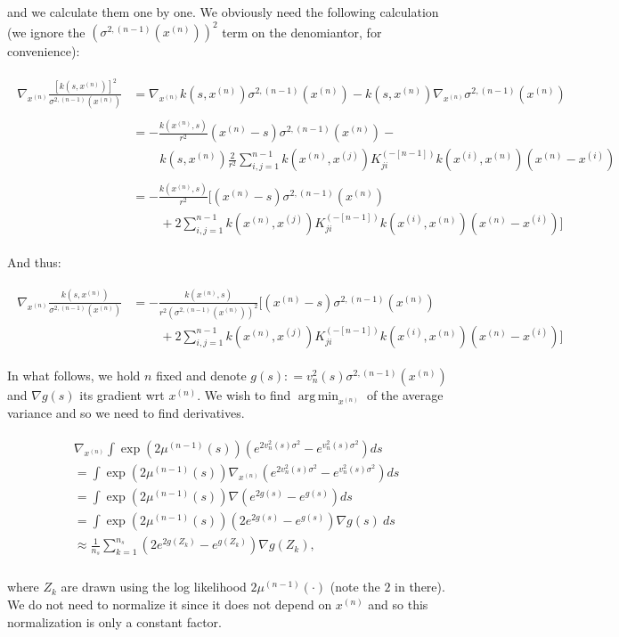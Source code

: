 \documentclass[paper=a4, fontsize=11pt]{scrartcl} %
\DeclareMathOperator*{\argmin}{arg\,min}
\numberwithin{equation}{section} %
\numberwithin{figure}{section} %
\numberwithin{table}{section} %
\newcommand{\bars}{ \ \ \ \ \ \ \ \ \ \ }
\newcommand{\gxn}{\nabla_{x^{(n)}}} %
\newcommand{\xn}{x^{(n)}}
\newcommand{\xii}{x^{(i)}}
\newcommand{\xj}{x^{(j)}}
\newcommand{\Kinvnm}{K^{(-[n-1])}}
\newcommand{\sqnm}{\sigma ^{2 , (n-1)}     }
\newcommand{\signxn}{\sigma^{2, (n-1)} (\xn)}
\begin{document}
and we calculate them one by one. We obviously need the following calculation (we ignore the $(\signxn)^2$ term on the denomiantor, for convenience):

\begin{align}
 \begin{split}
\gxn \frac{ [k(s, \xn)]^2 }{\signxn} &= \gxn k(s, \xn)\signxn - k(s, \xn)\gxn\signxn \\\\
%
%
%
&= -\frac{k(\xn ,s)}{r^2} (\xn-s)\signxn -  \\
	   &\bars k(s, \xn) \frac{2}{r^2}\sum_{i,j=1}^{n-1} k(\xn,\xj) \Kinvnm_{ji} k(\xii ,\xn) (\xn-\xii)\\\\
%
%
&= -\frac{k(\xn ,s)}{r^2} [(\xn -s) \signxn \\ 
     & \bars + 2\sum_{i,j=1}^{n-1} k(\xn,\xj) \Kinvnm_{ji} k(\xii ,\xn) (\xn-\xii)]
 \end{split}
\end{align}

And thus:

\begin{align}
 \begin{split}
\gxn \frac{ k(s, \xn) }{\signxn} & = -\frac{k(\xn ,s)}{r^2(\signxn)^2} [(\xn -s) \signxn \\ 
		& \bars + 2\sum_{i,j=1}^{n-1} k(\xn,\xj) \Kinvnm_{ji} k(\xii ,\xn) (\xn-\xii)]
 \end{split}
\end{align}


In what follows, we hold $n$ fixed and denote $g(s) : = v_n^2(s)\sqnm(\xn)$ and $\nabla g(s)$ its gradient wrt $\xn$. We wish to find 
$\argmin_{\xn}$ of the average variance and so we need to find derivatives.

\begin{align}
 \begin{split}
 & \gxn \int \exp(2\mu^{(n-1)}(s)) (e^{2v^2_n(s)\sigma^2 } - e^{v^2_n(s)\sigma^2 }) ds \\
%
%
% 
&=  \int \exp(2\mu^{(n-1)}(s)) \gxn (e^{2v^2_n(s)\sigma^2 } - e^{v^2_n(s)\sigma^2 }) ds \\
%
%
%
%
%
% 
&=  \int \exp(2\mu^{(n-1)}(s)) \nabla (e^{2g(s) } - e^{g(s)}) ds \\
%
%
% 
%
%
%
% 
&=  \int \exp(2\mu^{(n-1)}(s)) (2e^{2g(s) } - e^{g(s)})\nabla g(s)\  ds \\
%
%
% 
%
%
%
% 
&\approx \frac{1}{n_s}  \sum_{k=1}^{n_s} (2e^{2g(Z_k) } - e^{g(Z_k)})\nabla g(Z_k), \\
%
%
% 
 \end{split}
\end{align}

where $Z_k$ are drawn using the log likelihood $2\mu^{(n-1)}(\cdot)$ (note the $2$ in there). We do not need to normalize it since it does not depend 
on $x^{(n)}$ and so this normalization is only a constant factor.
\end{document}
